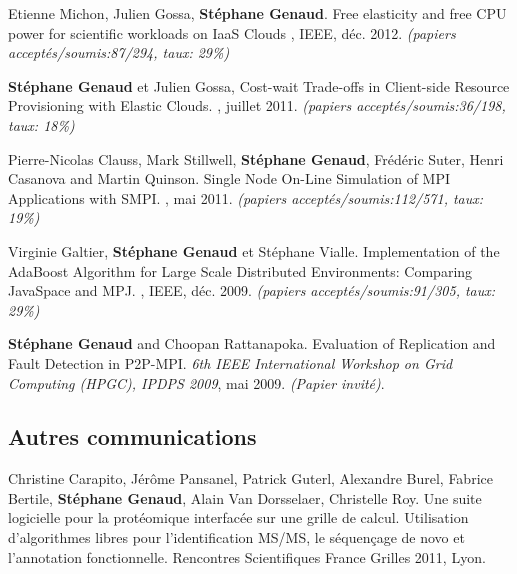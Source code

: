 \documentclass[11pt]{article}
\begin{document}
\begin{thebibliography}{99}
Etienne Michon, Julien Gossa, \textbf{Stéphane Genaud}.
\newblock Free elasticity and free CPU power for scientific workloads on IaaS Clouds
, 
IEEE, déc. 2012.
\newblock \small{\textit{(papiers acceptés/soumis:87/294, taux: 29\%)}}


\newblock \textbf{Stéphane Genaud} et Julien Gossa,
\newblock Cost-wait Trade-offs in Client-side Resource Provisioning with 
Elastic Clouds.
, juillet 2011.
\newblock \small{\textit{(papiers acceptés/soumis{:}36/198, taux: 18\%)}}


\newblock Pierre-Nicolas Clauss, Mark Stillwell, \textbf{Stéphane Genaud}, 
Fr\'ed\'eric Suter, Henri Casanova and  Martin Quinson.
\newblock Single Node On-Line Simulation of MPI Applications with SMPI.
, mai 2011.
\newblock \small{\textit{(papiers acceptés/soumis{:}112/571, taux: 19\%)}}

\newblock Virginie Galtier, \textbf{Stéphane Genaud} et Stéphane Vialle.
\newblock Implementation of the AdaBoost Algorithm for Large Scale Distributed 
Environments: Comparing JavaSpace and MPJ.
, 
IEEE, déc. 2009.
\newblock \small{\textit{(papiers acceptés/soumis:91/305, taux: 29\%)}}


\textbf{Stéphane Genaud} and Choopan Rattanapoka.
\newblock Evaluation of Replication and Fault Detection in P2P-MPI.
\newblock 
{\em 6th IEEE International Workshop on Grid Computing (HPGC), IPDPS 2009}, 
mai 2009.
\newblock \textit{(Papier invité)}.

\subsection*{Autres communications}

Christine Carapito, Jérôme Pansanel, Patrick Guterl, Alexandre Burel, Fabrice 
Bertile, \textbf{Stéphane Genaud}, Alain Van Dorsselaer, Christelle Roy.
\newblock Une suite logicielle pour la protéomique interfacée sur une grille de 
calcul. Utilisation d'algorithmes libres pour l'identification MS/MS, le 
séquençage de novo et l'annotation fonctionnelle.
\newblock Rencontres Scientifiques France Grilles 2011, Lyon.


\end{thebibliography}
\end{document}
